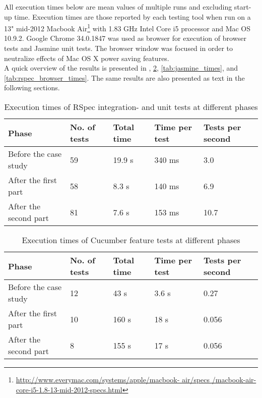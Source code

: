 \label{sec:results_time}

All execution times below are mean values of multiple runs and excluding
start-up time. Execution times are those reported by each testing tool
when run on a 13" mid-2012 Macbook
Air\footnote{\url{http://www.everymac.com/systems/apple/macbook-
air/specs /macbook-air-core-i5-1.8-13-mid-2012-specs.html}} with 1.83
GHz Intel Core i5 processor and Mac OS 10.9.2. Google Chrome 34.0.1847
was used as browser for execution of browser tests and Jasmine unit
tests. The browser window was focused in order to neutralize effects of
Mac OS X power saving features.\\

A quick overview of the results is presented in ,
\ref{tab:cucumber_times}, \ref{tab:jasmine_times}, and
\ref{tab:rspec_browser_times}. The same results are also presented as
text in the following sections.\\

\begin{table}[t]
    \centering
    \begin{tabular}{l l l l l}
        Phase & No. of tests & Total time & Time per test & Tests per second\\
        \hline
        Before the case study & 59 & 19.9 s & 340 ms & 3.0 \\
        After the first part  & 58 & 8.3 s  & 140 ms & 6.9 \\
        After the second part & 81 & 7.6 s  & 153 ms & 10.7\\
    \end{tabular}
    \caption{ Execution times of RSpec integration- and unit tests at different phases }
    \label{tab:unit_times}
\end{table}

\begin{table}[t]
    \centering
    \begin{tabular}{l l l l l}
        Phase & No. of tests & Total time & Time per test & Tests per second \\
        \hline
        Before the case study & 12 & 43 s & 3.6 s & 0.27 \\
        After the first part  & 10 & 160 s & 18 s & 0.056\\
        After the second part & 8 &  155 s & 17 s & 0.056\\
    \end{tabular}
    \caption{ Execution times of Cucumber feature tests at different phases }
    \label{tab:cucumber_times}
\end{table}

